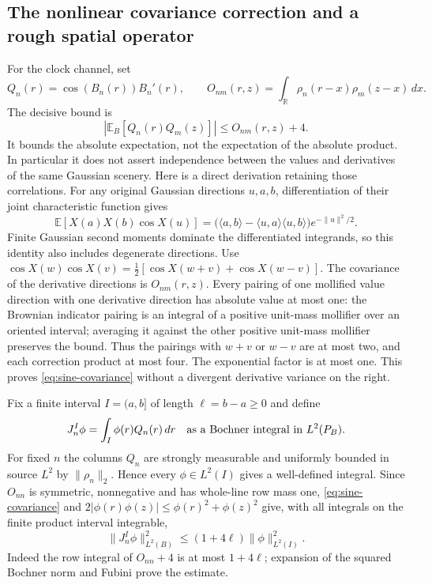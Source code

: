 \documentclass[11pt]{article}
\newcommand{\R}{\mathbb R}\newcommand{\E}{\mathbb E}
\begin{document}
\subsection{The nonlinear covariance correction and a rough spatial operator}
For the clock channel, set
\[
 Q_n(r)=\cos(B_n(r))B_n'(r),\qquad
 O_{nm}(r,z)=\int_\R\rho_n(r-x)\rho_m(z-x)\,dx.
\]
The decisive bound is
\begin{equation}\label{eq:sine-covariance}
 |\E_B[Q_n(r)Q_m(z)]|\leq O_{nm}(r,z)+4.
\end{equation}
It bounds the absolute expectation, not the expectation of the
absolute product. In particular it does not assert independence
between the values and derivatives of the same Gaussian scenery.
Here is a direct derivation retaining those correlations. For any
original Gaussian directions $u,a,b$, differentiation of their joint
characteristic function gives
\[
 \E[X(a)X(b)\cos X(u)]
 =\bigl(\langle a,b\rangle-\langle u,a\rangle\langle u,b\rangle\bigr)
       e^{-\|u\|^2/2}.
\]
Finite Gaussian second moments dominate the differentiated
integrands, so this identity also includes degenerate directions.
Use $\cos X(w)\cos X(v)=\tfrac12[\cos X(w+v)+\cos X(w-v)]$.
The covariance of the derivative directions is $O_{nm}(r,z)$.
Every pairing of one mollified value direction with one derivative
direction has absolute value at most one: the Brownian indicator
pairing is an integral of a positive unit-mass mollifier over an
oriented interval; averaging it against the other positive unit-mass
mollifier preserves the bound. Thus the pairings with $w+v$ or
$w-v$ are at most two, and each correction product at most four.
The exponential factor is at most one. This proves
\eqref{eq:sine-covariance} without a divergent derivative variance
on the right.

Fix a finite interval $I=(a,b]$ of length $\ell=b-a\geq0$ and define
\[
 J_n^I\phi=\int_I\phi(r)Q_n(r)\,dr
 \quad\hbox{as a Bochner integral in }L^2(P_B).
\]
For fixed $n$ the columns $Q_n$ are strongly measurable and uniformly
bounded in source $L^2$ by $\|\rho_n\|_2$. Hence every
$\phi\in L^2(I)$ gives a well-defined integral. Since $O_{nn}$ is
symmetric, nonnegative and has whole-line row mass one,
\eqref{eq:sine-covariance} and $2|\phi(r)\phi(z)|\leq\phi(r)^2+\phi(z)^2$
give, with all integrals on the finite product interval integrable,
\begin{equation}\label{eq:sine-spatial-bound}
 \|J_n^I\phi\|_{L^2(B)}^2
 \leq(1+4\ell)\|\phi\|_{L^2(I)}^2.
\end{equation}
Indeed the row integral of $O_{nn}+4$ is at most $1+4\ell$;
expansion of the squared Bochner norm and Fubini prove the estimate.
\end{document}
